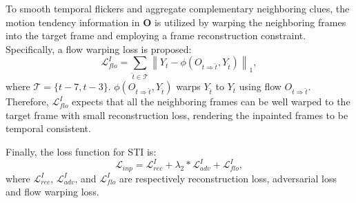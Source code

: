 To smooth temporal flickers and aggregate complementary neighboring clues, the motion tendency information in $\boldsymbol{O}$ is utilized by warping the neighboring frames into the target frame and employing a frame reconstruction constraint.
Specifically, a flow warping loss is proposed:
\begin{equation}
\label{eq:inp_flow}
\mathcal{L}^I_{flo}=\sum_{\widehat{t}\in\mathcal{T}}\left\| Y_t-\phi(O_{t\Rightarrow \widehat{t}},Y_{\widehat{t}}) \right\|_1,
\end{equation}
where $\mathcal{T}=\{t-7,t-3\}$. $\phi(O_{t\Rightarrow \widehat{t}},Y_{\widehat{t}})$ warps $Y_{\widehat{t}}$ to $Y_{t}$ using flow $O_{t\Rightarrow \widehat{t}}$.
Therefore, $\mathcal{L}^I_{flo}$ expects that all the neighboring frames can be well warped to the target frame with small reconstruction loss, rendering the inpainted frames to be temporal consistent.



Finally, the loss function for STI is:
\begin{equation}
\label{eq:inpain_all}
\mathcal{L}_{inp}=\mathcal{L}^{I}_{rec}+\lambda_2 * \mathcal{L}^I_{adv}+ \mathcal{L}^I_{flo},
\end{equation}
where $\mathcal{L}^{I}_{rec}$, $\mathcal{L}^I_{adv}$, and $\mathcal{L}^I_{flo}$ are respectively reconstruction loss, adversarial loss and flow warping loss.







